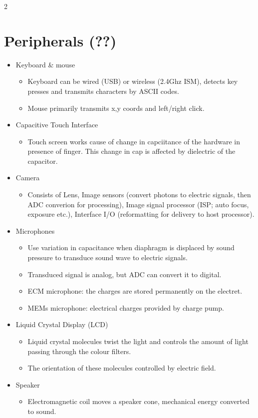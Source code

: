 \documentclass[10pt]{article}
\begin{document}
\begin{multicols}{2}
\section*{Peripherals (??)}
{}
\begin{itemize}
    \item Keyboard \& mouse
    \begin{itemize}
        \item Keyboard can be wired (USB) or wireless (2.4Ghz ISM), detects key presses and transmits characters by ASCII codes.
        \item Mouse primarily transmits x,y coords and left/right click.
    \end{itemize}
    \item Capacitive Touch Interface
    \begin{itemize}
        \item Touch screen works cause of change in capciitance of the hardware in presence of finger.
        This change in cap is affected by dielectric of the capacitor.
    \end{itemize}
    \item Camera
    \begin{itemize}
        \item Consists of Lens, Image sensors (convert photons to electric signals, then ADC converion for processing), Image signal processor (ISP; auto focus, exposure etc.), Interface I/O (reformatting for delivery to host processor). 
    \end{itemize}
    \item Microphones
    \begin{itemize}
        \item Use variation in capacitance when diaphragm is displaced by sound pressure to transduce sound wave to electric signals.
        \item Transduced signal is analog, but ADC can convert it to digital.
        \item ECM microphone: the charges are stored permanently on the electret.
        \item MEMs microphone: electrical charges provided by charge pump.
    \end{itemize}
    \item Liquid Crystal Display (LCD)
    \begin{itemize}
        \item Liquid crystal molecules twist the light and controls the amount of light passing through the colour filters.
        \item The orientation of these molecules controlled by electric field.
    \end{itemize}
    \item Speaker
    \begin{itemize}
        \item Electromagnetic coil moves a speaker cone, mechanical energy converted to sound.
    \end{itemize}
\end{itemize}


\end{multicols}
\end{document}
